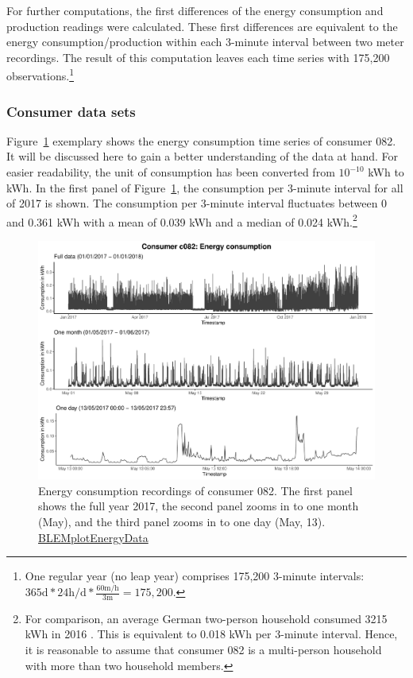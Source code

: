 For further computations, the first differences of the energy consumption and production readings were calculated. These first differences are equivalent to the energy consumption/production within each 3-minute interval between two meter recordings. The result of this computation leaves each time series with 175,200 observations.\footnote{One regular year (no leap year) comprises 175,200 3-minute intervals: $365\text{d} * 24\text{h/d} * \frac{60\text{m/h}}{3\text{m}} = 175,200$.}



\subsubsection{Consumer data sets}

Figure~\ref{Fig:energycons_c082} exemplary shows the energy consumption time series of consumer 082. It will be discussed here to gain a better understanding of the data at hand. For easier readability, the unit of consumption has been converted from $10^{-10}$ kWh to kWh. In the first panel of Figure~\ref{Fig:energycons_c082}, the consumption per 3-minute interval for all of 2017 is shown. The consumption per 3-minute interval fluctuates between 0 and 0.361 kWh with a mean of 0.039 kWh and a median of 0.024 kWh.\footnote{For comparison, an average German two-person household consumed 3215 kWh in 2016 \citep{Destatis:2018}. This is equivalent to 0.018 kWh per 3-minute interval. Hence, it is reasonable to assume that consumer 082 is a multi-person household with more than two household members.}

\begin{figure}[htbp]
 \centering
\includegraphics[width=\textwidth]{thesis/graphs/timeseries/c082_cons.pdf}
\caption[Energy consumption recordings of consumer 082]{Energy consumption recordings of consumer 082. The first panel shows the full year 2017, the second panel zooms in to one month (May), and the third panel zooms in to one day (May, 13). \quantnet\href{}{BLEMplotEnergyData}}
\label{Fig:energycons_c082}
\end{figure}

